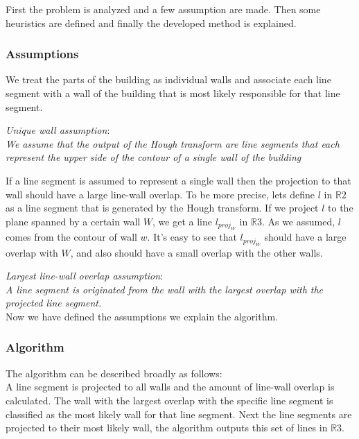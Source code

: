 \documentclass[10pt]{article}
\begin{document}
	First the problem is analyzed and a few assumption are made.  Then some
	heuristics are defined and finally the developed method is explained.
	\subsubsection{Assumptions}
	We treat the parts of the building as individual walls and associate each
	line segment with a wall of the building that is most likely responsible for
	that line segment. 

	\emph{Unique wall assumption}:\\
	\emph{We assume that the output of the Hough transform are line segments that
	each represent the upper side of the contour of a single wall of the building}



	If a line segment is assumed to represent a single wall then the
	projection to that wall should have a large line-wall overlap. To be more
	precise, lets define $l$ in $\mathbb{R}2$ as a line segment that is generated by the Hough
	transform.  If we project $l$ to the plane spanned by a certain wall $W$, we
	get a line $l_{proj_W}$ in $\mathbb{R}3$.  As we assumed, $l$ comes from the 
	contour of wall $w$. It's easy to see that $l_{proj_W}$
	should have a large overlap with $W$, and also should have a small overlap with
	the other walls.
	
	\emph{Largest line-wall overlap assumption}:\\
	\emph{A line segment is originated from the wall with the largest overlap
	with the projected line segment.}\\

	Now we have defined the assumptions we explain the algorithm.

	\subsubsection{Algorithm}
	The algorithm can be described broadly as follows:\\
	A line segment is projected to all walls and the amount of line-wall overlap is
	calculated. The wall with the largest overlap with the specific line
segment is classified as the most likely wall for that line segment.
	Next the line segments are projected to their most likely wall, the
	algorithm outputs this set of lines in $\mathbb{R}3$. 
	
\end{document}
